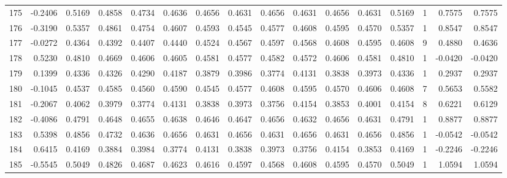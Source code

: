\begin{tabular}{lrrrrrrrrrrrrrrr}
175 &     -0.2406 &  0.5169 &  0.4858 &  0.4734 &  0.4636 &  0.4656 &  0.4631 &  0.4656 &  0.4631 &  0.4656 &   0.4631 &     0.5169 &      1 &                    0.7575 &                     0.7575 \\
176 &     -0.3190 &  0.5357 &  0.4861 &  0.4754 &  0.4607 &  0.4593 &  0.4545 &  0.4577 &  0.4608 &  0.4595 &   0.4570 &     0.5357 &      1 &                    0.8547 &                     0.8547 \\
177 &     -0.0272 &  0.4364 &  0.4392 &  0.4407 &  0.4440 &  0.4524 &  0.4567 &  0.4597 &  0.4568 &  0.4608 &   0.4595 &     0.4608 &      9 &                    0.4880 &                     0.4636 \\
178 &      0.5230 &  0.4810 &  0.4669 &  0.4606 &  0.4605 &  0.4581 &  0.4577 &  0.4582 &  0.4572 &  0.4606 &   0.4581 &     0.4810 &      1 &                   -0.0420 &                    -0.0420 \\
179 &      0.1399 &  0.4336 &  0.4326 &  0.4290 &  0.4187 &  0.3879 &  0.3986 &  0.3774 &  0.4131 &  0.3838 &   0.3973 &     0.4336 &      1 &                    0.2937 &                     0.2937 \\
180 &     -0.1045 &  0.4537 &  0.4585 &  0.4560 &  0.4590 &  0.4545 &  0.4577 &  0.4608 &  0.4595 &  0.4570 &   0.4606 &     0.4608 &      7 &                    0.5653 &                     0.5582 \\
181 &     -0.2067 &  0.4062 &  0.3979 &  0.3774 &  0.4131 &  0.3838 &  0.3973 &  0.3756 &  0.4154 &  0.3853 &   0.4001 &     0.4154 &      8 &                    0.6221 &                     0.6129 \\
182 &     -0.4086 &  0.4791 &  0.4648 &  0.4655 &  0.4638 &  0.4646 &  0.4647 &  0.4656 &  0.4632 &  0.4656 &   0.4631 &     0.4791 &      1 &                    0.8877 &                     0.8877 \\
183 &      0.5398 &  0.4856 &  0.4732 &  0.4636 &  0.4656 &  0.4631 &  0.4656 &  0.4631 &  0.4656 &  0.4631 &   0.4656 &     0.4856 &      1 &                   -0.0542 &                    -0.0542 \\
184 &      0.6415 &  0.4169 &  0.3884 &  0.3984 &  0.3774 &  0.4131 &  0.3838 &  0.3973 &  0.3756 &  0.4154 &   0.3853 &     0.4169 &      1 &                   -0.2246 &                    -0.2246 \\
185 &     -0.5545 &  0.5049 &  0.4826 &  0.4687 &  0.4623 &  0.4616 &  0.4597 &  0.4568 &  0.4608 &  0.4595 &   0.4570 &     0.5049 &      1 &                    1.0594 &                     1.0594 \\

\end{tabular}
